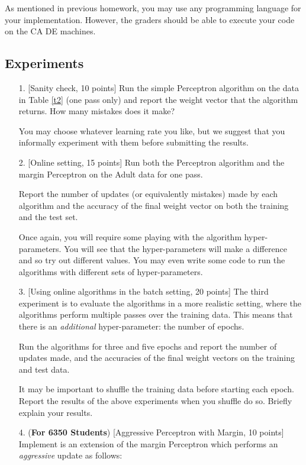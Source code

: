 {\footnotesize As mentioned in previous homework, you may use any
  programming language for your implementation. However, the graders
  should be able to execute your code on the CA DE machines.}

\subsection{Experiments}

\begin{enumerate}
\item[1.] [Sanity check, 10 points] Run the simple Perceptron algorithm
  on the data in Table \ref{t2} (one pass only) and report the weight
  vector that the algorithm returns. How many mistakes does it make?

  You may choose whatever learning rate you like, but we suggest that
  you informally experiment with them before submitting the results. 
  
\item[2.] [Online setting, 15 points] Run both the Perceptron algorithm
  and the margin Perceptron on the Adult data for one pass. 
  
  Report the number of updates (or equivalently mistakes) made by each
  algorithm and the accuracy of the final weight vector on both the
  training and the test set.

  Once again, you will require some playing with the algorithm
  hyper-parameters. You will see that the hyper-parameters will make a
  difference and so try out different values. You may even write some
  code to run the algorithms with different sets of hyper-parameters.

\item[3.] [Using online algorithms in the batch setting, 20 points]
  The third experiment is to evaluate the algorithms in a more
  realistic setting, where the algorithms perform multiple passes over
  the training data. This means that there is an {\em additional}
  hyper-parameter: the number of epochs.

  Run the algorithms for three and five epochs and report the number
  of updates made, and the accuracies of the final weight vectors on
  the training and test data.
  
  It may be important to shuffle the training data before starting
  each epoch. Report the results of the above experiments when you
  shuffle do so. Briefly explain your results.

\item[4.] ({\bf For 6350 Students}) [Aggressive Perceptron with
  Margin, 10 points] Implement is an extension of the margin
  Perceptron which performs an {\em aggressive} update as follows:


\end{enumerate}
